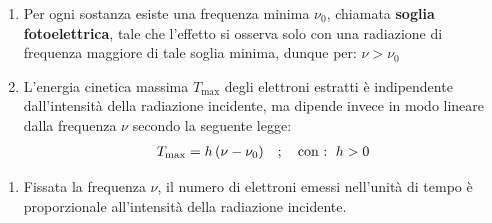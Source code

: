 \vspace{1em}
\begin{minipage}{0.6\textwidth}

\begin{enumerate}[label=\arabic*)]

	\item Per ogni sostanza esiste una frequenza minima $\nu_0$, chiamata \textbf{soglia fotoelettrica}, tale che l'effetto si osserva solo con una radiazione di frequenza maggiore di tale soglia minima, dunque per: $\nu > \nu_0$
	
	\item L'energia cinetica massima $T_{\text{max}}$ degli elettroni estratti è indipendente dall'intensità della radiazione incidente, ma dipende invece in modo lineare dalla frequenza $\nu$ secondo la seguente legge:
	\begin{align*}
		T_{\text{max}} = h \, \qty(\nu - \nu_0) \quad ; \quad \text{con :\,  } h > 0
	\end{align*}

\end{enumerate}
	
\end{minipage}
\hfill
\begin{minipage}{0.3\textwidth}


\end{minipage}
\vspace{1em}

\begin{enumerate}[label=\arabic*), start = 3]
    \item Fissata la frequenza $\nu$, il numero di elettroni emessi nell'unità di tempo è proporzionale all'intensità della radiazione incidente.
\end{enumerate}

